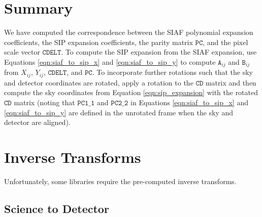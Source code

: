 \documentclass[10pt]{article}
\newcommand{\sipA}[2]{\ensuremath{\mathtt{A}_{#1 #2}}}
\newcommand{\sipB}[2]{\ensuremath{\mathtt{B}_{#1 #2}}}
\begin{document}
\section{Summary}

We have computed the correspondence between the SIAF polynomial
expansion coefficients, the SIP expansion coefficients, the
parity matrix $\mathtt{PC}$, and the pixel scale vector
$\mathtt{CDELT}$. To compute the SIP expansion from the SIAF
expansion, use Equations \ref{eqn:siaf_to_sip_x} and \ref{eqn:siaf_to_sip_y}
to compute $\sipA{i}{j}$ and $\sipB{i}{j}$ from $X_{ij}$, $Y_{ij}$,
$\mathtt{CDELT}$, and $\mathtt{PC}$. To incorporate further rotations
such that the sky and detector coordinates are rotated, apply a rotation
to the $\mathtt{CD}$ matrix and then compute the sky coordinates from
Equation \ref{eqn:sip_expansion} with the rotated $\mathtt{CD}$ matrix
(noting that $\mathtt{PC1\_1}$ and $\mathtt{PC2\_2}$ in Equations
\ref{eqn:siaf_to_sip_x}
 and \ref{eqn:siaf_to_sip_y} are defined in the unrotated frame when the
 sky and detector are aligned).

 \section{Inverse Transforms}

 Unfortunately, some libraries require the pre-computed inverse transforms.

 \subsection{Science to Detector}
\end{document}
